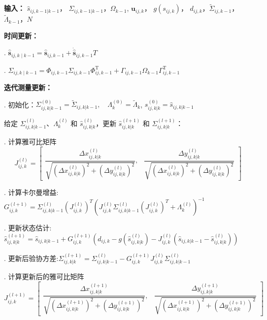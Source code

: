 \begin{algorithm}[htbp]
\caption{基于期望最大化算法的自适应扩展卡尔曼滤波算法}
\label{alg:AEKF_UAV}

\begin{algorithmic}

\State \textbf{输入：}  $\hat{s}_{ij,k-1|k-1}$， $\Sigma_{ij,k-1|k-1}$，$\Omega_{k-1}$, $\mathbf{u}_{ij, k}$， $g(s_{ij,k})$，
 $d_{ij,k}$，$\tilde{\Sigma}_{ij,k-1}$，
$\tilde{\Lambda}_{k-1}$，$N$

\State \textbf{时间更新：}

. $\hat{\mathbf{s}}_{i j, k \mid k-1}=\hat{\mathbf{s}}_{i j, k-1}+\dot{\hat{\mathbf{s}}}_{i j, k-1} T$


. $\Sigma_{i j, k \mid k-1}=\Phi_{i j, k-1} \Sigma_{i j, k-1} \Phi_{i j, k-1}^{\mathrm{T}}+\Gamma_{i j, k-1} \Omega_{k-1} \Gamma_{i j, k-1}^{\mathrm{T}}$

\State \textbf{迭代测量更新：}

. 初始化：$\Sigma^{(0)}_{ij,k|k-1} = \tilde{\Sigma}_{ij,k|k-1},\quad \Lambda^{(0)}_k = \tilde{\Lambda}_k$, $\hat{s}^{(0)}_{ij,k|k} = \hat{s}_{ij,k|k-1}$


\State 给定 $\Sigma^{(l)}_{ij,k|k-1}$、$\Lambda^{(l)}_k$ 和 $\hat{s}^{(l)}_{ij,k|k}$，更新 $\hat{s}^{(l+1)}_{ij,k|k}$ 和 $\Sigma^{(l+1)}_{ij,k|k}$：

. 计算雅可比矩阵
\[
J^{(l)}_{ij,k} =
\begin{bmatrix} 
\dfrac{\Delta x^{(l)}_{ij,k|k}}{\sqrt{(\Delta x^{(l)}_{ij,k|k})^2 + (\Delta y^{(l)}_{ij,k|k})^2}}, &
\dfrac{\Delta y^{(l)}_{ij,k|k}}{\sqrt{(\Delta x^{(l)}_{ij,k|k})^2 + (\Delta y^{(l)}_{ij,k|k})^2}}
\end{bmatrix}
\]

. 计算卡尔曼增益: $G^{(l+1)}_{ij,k} =
\Sigma^{(l)}_{ij,k|k-1}(J^{(l)}_{ij,k})^T
\left(
J^{(l)}_{ij,k}\Sigma^{(l)}_{ij,k|k-1}(J^{(l)}_{ij,k})^T + \Lambda^{(l)}_k
\right)^{-1}$

. 更新状态估计:$
\hat{s}^{(l+1)}_{ij,k|k}
=
\hat{s}_{ij,k|k-1}
+
G^{(l+1)}_{ij,k}
\left(
d_{ij,k}
-
g(\hat{s}^{(l)}_{ij,k|k})
-
J^{(l)}_{ij,k}
(\hat{s}_{ij,k|k-1} - \hat{s}^{(l)}_{ij,k|k})
\right)
$

. 更新后验协方差:$
\Sigma^{(l+1)}_{ij,k|k}
=
\Sigma^{(l)}_{ij,k|k-1}
-
G^{(l+1)}_{ij,k}
J^{(l)}_{ij,k}
\Sigma^{(l)}_{ij,k|k-1}
$

. 计算更新后的雅可比矩阵
\[
J^{(l+1)}_{ij,k} =
\begin{bmatrix} 
\dfrac{\Delta x^{(l+1)}_{ij,k|k}}{\sqrt{(\Delta x^{(l+1)}_{ij,k|k})^2 + (\Delta y^{(l+1)}_{ij,k|k})^2}}, &
\dfrac{\Delta y^{(l+1)}_{ij,k|k}}{\sqrt{(\Delta x^{(l+1)}_{ij,k|k})^2 + (\Delta y^{(l+1)}_{ij,k|k})^2}}
\end{bmatrix}
\]


\end{algorithmic}
\end{algorithm}
